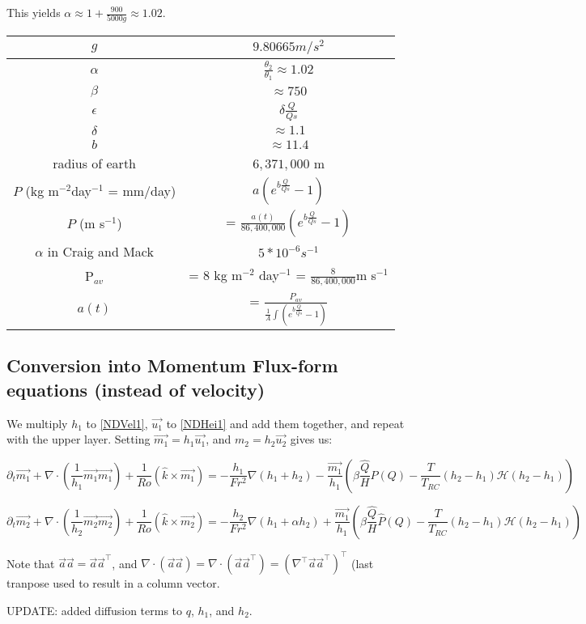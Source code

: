 \documentclass[10pt]{article}
\newcommand{\HH}{\mathcal{H}}
\begin{document}
This yields $\alpha \approx 1+\frac{900}{5000g} \approx 1.02$.


\begin{center}
	\begin{tabular}{ |c|c| } 
		\hline
		$g$  & $9.80665 m/s^2$ \\  \hline
		$\alpha$  & $\frac{\theta_2}{\theta_1}\approx 1.02$ \\ \hline
		$\beta$ &  $\approx 750$ \\ \hline
		$\epsilon$ &   $\delta \frac{Q}{Qs}$ \\ \hline
		$\delta$ & $ \approx 1.1$  \\ \hline
		$b$& $ \approx 11.4$\\ \hline
		radius of earth & $6,371,000$ m \\ \hline
		$P$ (kg m$^{-2}$day$^{-1}$ = mm/day)& $a(e^{b\frac{Q}{Qs}}-1)$ \\ 
		$P$ (m s$^{-1}$) &=  $\frac{a(t)}{86,400,000}(e^{b\frac{Q}{Qs}}-1)$\\
		$\alpha$ in Craig and Mack & $5 * 10^{-6} s^{-1}$ \\ \hline
		P$_{av}$ &= $8$ kg m$^{-2}$ day$^{-1}$ = $\frac{8}{86,400,000}$m s$^{-1}$ \\ \hline
		$a(t)$  &= $\frac{P_{av}}{\frac{1}{A}\int (e^{b\frac{Q}{Qs}}-1)}$ \\ \hline
	\end{tabular}
\end{center}


\subsection{Conversion into Momentum Flux-form equations (instead of velocity)}
We multiply $h_1$ to  \ref{NDVel1}, $\vec{u_1}$ to \ref{NDHei1} and add them together, and repeat with the upper layer. Setting $\vec{m_1} = h_1\vec{u_1}$, and $m_2=h_2\vec{u_2}$ gives us:

\begin{equation}
\partial_t\vec{m_1} + \nabla \cdot \left(\frac{1}{h_1}\vec{m_1}\vec{m_1}\right) + \frac{1}{Ro}\left(\hat{k}\times \vec{m_1}\right) = -\frac{h_1}{Fr^2}\nabla\left(h_1 + h_2\right) -\frac{\vec{m_1}}{h_1} \left( \beta \frac{\hat{Q}}{H}\hat{P}(Q) - \frac{T}{T_{RC}}(h_2-h_1)\HH{(h_2-h_1)}\right)
\end{equation}

\begin{equation}
\partial_t\vec{m_2} + \nabla \cdot \left(\frac{1}{h_2}\vec{m_2}\vec{m_2}\right) + \frac{1}{Ro}\left(\hat{k}\times \vec{m_2}\right) = -\frac{h_2}{Fr^2}\nabla\left( h_1 + \alpha h_2\right)  +\frac{\vec{m_1}}{h_1} \left( \beta \frac{\hat{Q}}{H}\hat{P}(Q) - \frac{T}{T_{RC}}(h_2-h_1)\HH{(h_2-h_1)}\right)
\end{equation}

Note that $\vec{a}\vec{a} = \vec{a}\vec{a}^{\top}$, and $\nabla\cdot (\vec{a}\vec{a}) = \nabla \cdot (\vec{a}\vec{a}^{\top}) = \left(\nabla^{\top}\vec{a}\vec{a}^{\top}\right)^{\top}$ (last tranpose used to result in a column vector.

UPDATE: added diffusion terms to $q$, $h_1$, and $h_2$.
\end{document}
